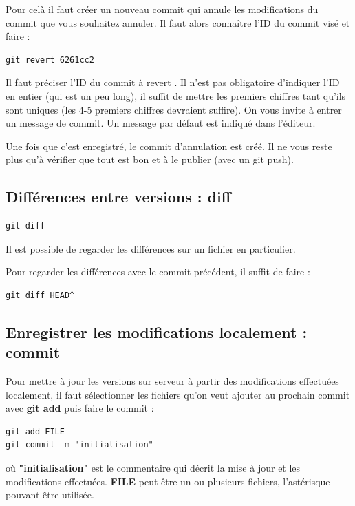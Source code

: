 \documentclass[a4paper,twoside]{article}
\begin{document}
Pour celà il faut créer un nouveau commit qui annule les modifications du commit que vous souhaitez annuler. Il faut alors connaître l'ID du commit visé et faire : 
\begin{verbatim}
git revert 6261cc2
\end{verbatim}
Il faut préciser l'ID du commit à \og revert \fg. Il n'est pas obligatoire d'indiquer l'ID en entier (qui est un peu long), il suffit de mettre les premiers chiffres tant qu'ils sont uniques (les 4-5 premiers chiffres devraient suffire). On vous invite à entrer un message de commit. Un message par défaut est indiqué dans l'éditeur.

Une fois que c'est enregistré, le commit d'annulation est créé. Il ne vous reste plus qu'à vérifier que tout est bon et à le publier (avec un git push).

\subsection{Différences entre versions : diff}

\begin{verbatim}
git diff
\end{verbatim}

\begin{remarque}
Il est possible de regarder les différences sur un fichier en particulier.
\end{remarque}

Pour regarder les différences avec le commit précédent, il suffit de faire :
\begin{verbatim}
git diff HEAD^
\end{verbatim}

\subsection{Enregistrer les modifications localement : commit}\label{sec:commit}

Pour mettre à jour les versions sur serveur à partir des modifications effectuées localement, il faut sélectionner les fichiers qu'on veut ajouter au prochain commit avec \textbf{git add} puis faire le commit :
\begin{verbatim}
git add FILE
git commit -m "initialisation"
\end{verbatim}
où \textbf{"initialisation"} est le commentaire qui décrit la mise à jour et les modifications effectuées. \textbf{FILE} peut être un ou plusieurs fichiers, l'astérisque pouvant être utilisée.
\end{document}
